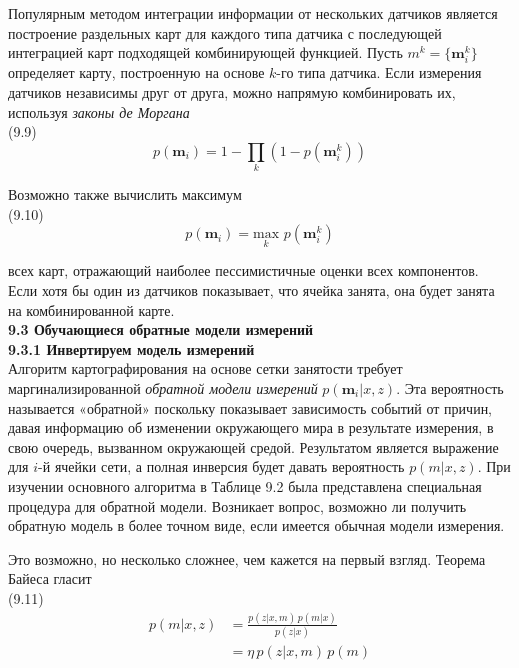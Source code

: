 \documentclass[10pt,a4paper]{article}
\begin{document}
Популярным методом интеграции информации от нескольких датчиков является построение раздельных карт для каждого типа датчика с последующей интеграцией карт подходящей комбинирующей функцией. Пусть $m^k = \{\textbf{m}_i^k\}$ определяет карту, построенную на основе $k$-го типа датчика. Если измерения датчиков независимы друг от друга, можно напрямую комбинировать их, используя \textit{законы де Моргана}\\

(9.9)
$$p(\textbf{m}_i)=1-\prod_k(1-p(\textbf{m}_i^k))$$

Возможно также вычислить максимум\\

(9.10)
$$p(\textbf{m}_i)=\underset{k}{\text{max}}\,\,p(\textbf{m}_i^k)$$

всех карт, отражающий наиболее пессимистичные оценки всех компонентов. Если хотя бы один из датчиков показывает, что ячейка занята, она будет занята на комбинированной карте.\\

\textbf{9.3	Обучающиеся обратные модели измерений}\\

\textbf{9.3.1	Инвертируем модель измерений}\\

Алгоритм картографирования на основе сетки занятости требует маргинализированной \textit{обратной модели измерений} $p(\textbf{m}_i | x, z)$. Эта вероятность называется «обратной» поскольку показывает зависимость событий от причин, давая информацию об изменении окружающего мира в результате измерения, в свою очередь, вызванном окружающей средой. Результатом является выражение для $i$-й ячейки сети, а полная инверсия будет давать вероятность $p(m | x, z)$. При изучении основного алгоритма в Таблице 9.2 была представлена специальная процедура для обратной модели. Возникает вопрос, возможно ли получить обратную модель в более точном виде, если имеется обычная модели измерения.

Это возможно, но несколько сложнее, чем кажется на первый взгляд. Теорема Байеса гласит\\

(9.11)
\begin{equation*}
\begin{split}
p(m|x,z)&=\frac{p(z|x,m)\,p(m|x)}{p(z|x)}\\
&=\eta\,p(z|x,m)\,p(m)
\end{split}
\end{equation*}
\end{document}
